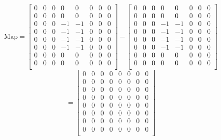 \documentclass{amsart}
\numberwithin{equation}{section}
\begin{document}
\begin{equation}
    \label{eq:map_removed}
    \text{Map}=
      \begin{bmatrix}
        0 & 0 & 0 & 0 & 0 & 0 & 0 & 0 \\
        0 & 0 & 0 & 0 & 0 & 0 & 0 & 0 \\
        0 & 0 & 0 & -1 & -1 & 0 & 0 & 0 \\
        0 & 0 & 0 & -1 & -1 & 0 & 0 & 0 \\
        0 & 0 & 0 & -1 & -1 & 0 & 0 & 0 \\
        0 & 0 & 0 & -1 & -1 & 0 & 0 & 0 \\
        0 & 0 & 0 & 0 & 0 & 0 & 0 & 0 \\
        0 & 0 & 0 & 0 & 0 & 0 & 0 & 0 \\
      \end{bmatrix}
      -
      \begin{bmatrix}
        0 & 0 & 0 & 0 & 0 & 0 & 0 & 0 \\
        0 & 0 & 0 & 0 & 0 & 0 & 0 & 0 \\
        0 & 0 & 0 & -1 & -1 & 0 & 0 & 0 \\
        0 & 0 & 0 & -1 & -1 & 0 & 0 & 0 \\
        0 & 0 & 0 & -1 & -1 & 0 & 0 & 0 \\
        0 & 0 & 0 & -1 & -1 & 0 & 0 & 0 \\
        0 & 0 & 0 & 0 & 0 & 0 & 0 & 0 \\
        0 & 0 & 0 & 0 & 0 & 0 & 0 & 0 \\
      \end{bmatrix}
\end{equation}
\begin{equation*}
    =\begin{bmatrix}
        0 & 0 & 0 & 0 & 0 & 0 & 0 & 0 \\
        0 & 0 & 0 & 0 & 0 & 0 & 0 & 0 \\
        0 & 0 & 0 & 0 & 0 & 0 & 0 & 0 \\
        0 & 0 & 0 & 0 & 0 & 0 & 0 & 0 \\
        0 & 0 & 0 & 0 & 0 & 0 & 0 & 0 \\
        0 & 0 & 0 & 0 & 0 & 0 & 0 & 0 \\
        0 & 0 & 0 & 0 & 0 & 0 & 0 & 0 \\
        0 & 0 & 0 & 0 & 0 & 0 & 0 & 0 \\
      \end{bmatrix}
\end{equation*}
\end{document}
